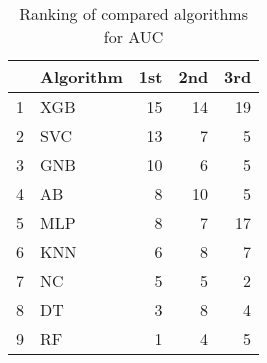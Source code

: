 \begin{table}
\footnotesize
\caption{Ranking of compared algorithms for AUC}
\label{tab:places AUC}
\begin{tabular}{llrrr}
\hline
 & Algorithm & 1st & 2nd & 3rd \\
\hline
1 & XGB & 15 & 14 & 19 \\
2 & SVC & 13 & 7 & 5 \\
3 & GNB & 10 & 6 & 5 \\
4 & AB & 8 & 10 & 5 \\
5 & MLP & 8 & 7 & 17 \\
6 & KNN & 6 & 8 & 7 \\
7 & NC & 5 & 5 & 2 \\
8 & DT & 3 & 8 & 4 \\
9 & RF & 1 & 4 & 5 \\
\hline
\end{tabular}
\end{table}
